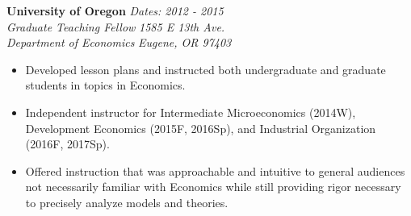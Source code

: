\documentclass[11pt]{article}
\newenvironment{changemargin}[2]{%
  \begin{list}{}{%
    \setlength{\topsep}{0pt}%
    \setlength{\leftmargin}{#1}%
    \setlength{\rightmargin}{#2}%
    \setlength{\listparindent}{\parindent}%
    \setlength{\itemindent}{\parindent}%
    \setlength{\parsep}{\parskip}%
  }%
  \item[]}{\end{list}
}
\newenvironment{body} {
	\vspace*{-16pt}
	\begin{changemargin}{-0.25in}{-0.5in}
  }	
	{\end{changemargin}
}
\begin{document}
\begin{body}
	\textbf{University of Oregon} \hfill \emph{Dates: 2012 - 2015}\\
	\emph{Graduate Teaching Fellow} \hfill \emph{1585 E 13th Ave.}\\
	\emph{Department of Economics} \hfill \emph{Eugene, OR 97403}\\
	\begin{itemize}
		\item Developed lesson plans and instructed both undergraduate and graduate students in topics in Economics.
		\item Independent instructor for Intermediate Microeconomics (2014W), Development Economics (2015F, 2016Sp), and Industrial Organization (2016F, 2017Sp).
		\item Offered instruction that was approachable and intuitive to general audiences not necessarily familiar with Economics while still providing rigor necessary to precisely analyze models and theories.
	\end{itemize}
				
\end{body}
\vspace{-9pt}
\smallskip
\end{document}
